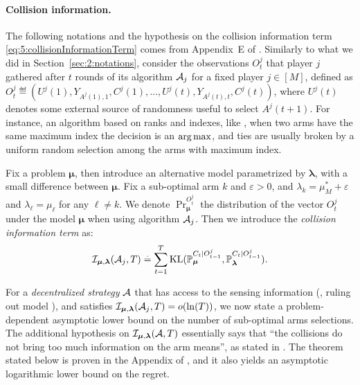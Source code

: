 \paragraph{Collision information.}
%
The following notations and the hypothesis on the collision information term \eqref{eq:5:collisionInformationTerm} comes from Appendix~E of \cite{KaufmannAbbas19}.
Similarly to what we did in Section~\ref{sec:2:notations},
consider the observations $O_t^j$ that player $j$ gathered after $t$ rounds of its algorithm $\mathcal{A}_j$ for a fixed player $j\in[M]$,
defined as $O_t^j \eqdef \left( U^j(1), Y_{A^j(1),1}, C^j(1), \ldots, U^j(t), Y_{A^j(t),t}, C^j(t) \right)$,
where $U^j(t)$ denotes some external source of randomness useful to select $A^j(t+1)$.
For instance, an algorithm based on ranks and \UCB{} indexes, like \RhoRand, when two arms have the same maximum index the decision is an $\operatorname*{arg\,max}$, and ties are usually broken by a uniform random selection among the arms with maximum index.

Fix a problem $\bm{\mu}$,
then introduce an alternative model parametrized by $\bm{\lambda}$, with a small difference between $\bm{\mu}$.
Fix a sub-optimal arm $k$ and $\varepsilon>0$, and $\lambda_k = \mu^*_M + \varepsilon$ and $\lambda_{\ell} = \mu_{\ell}$ for any $\ell\neq k$.
We denote $\Pr_{\bm{\mu}}^{O_t^j}$ the distribution of the vector $O_t^j$ under the model $\bm{\mu}$ when using algorithm $\mathcal{A}_j$.
Then we introduce the \emph{collision information term} as:
\begin{equation}\label{eq:5:collisionInformationTerm}
  \mathcal{I}_{\bm{\mu},\bm{\lambda}}(\mathcal{A}_j,T) \overset{.}{=} \sum_{t=1}^{T} \mathrm{KL}(\mathbb{P}_{\bm{\mu}}^{C_t | O_{t-1}^j}, \mathbb{P}_{\bm{\lambda}}^{C_t | O_{t-1}^j}).
\end{equation}

For a \emph{decentralized strategy} $\mathcal{A}$ that has access to the sensing information (\ie, ruling out model \modeltrois), and satisfies $\mathcal{I}_{\bm{\mu},\bm{\lambda}}(\mathcal{A}_j,T) = \mathop{}\mathopen{}o\mathopen{}\left(\ln(T)\right)$,
we now state a problem-dependent asymptotic lower bound on the number of sub-optimal arms selections.
The additional hypothesis on $\mathcal{I}_{\bm{\mu},\bm{\lambda}}(\mathcal{A},T)$ essentially says that ``the collisions do not bring too much information on the arm means'', as stated in \cite{KaufmannAbbas19}.
The theorem stated below is proven in the Appendix of \cite{Besson2018ALT},
and it also yields an asymptotic logarithmic lower bound on the regret.

